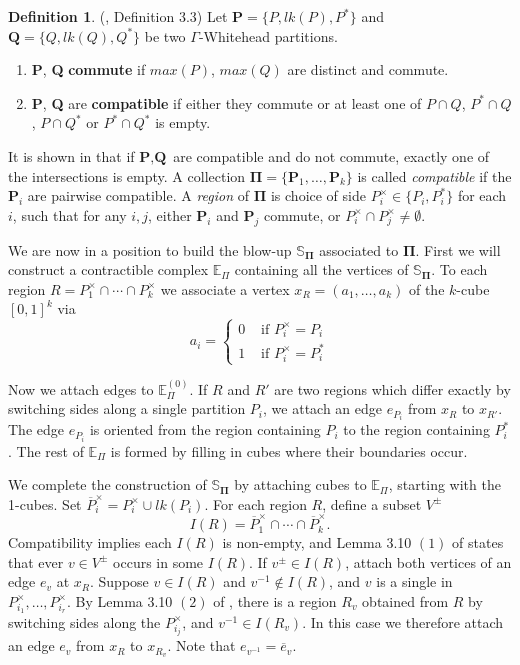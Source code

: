\documentclass[11pt]{amsart}
\numberwithin{thm}{section}
\theoremstyle{remark}
\theoremstyle{definition}
\newtheorem{definition}[thm]{Definition}
\newcommand{\overl}[1]{\overline{#1}}
\newcommand{\E}{\mathbb{E}}
\newcommand{\Sa}{\mathbb{S}}
\begin{document}
\begin{definition} (\cite{CSV12}, Definition 3.3) Let $\textbf{P}=\{P,lk(P), P^*\}$ and $\textbf{Q}=\{Q,lk(Q), Q^*\}$ be two $\Gamma$-Whitehead partitions.  \begin{enumerate}
\item \textbf{P}, \textbf{Q} \textbf{commute} if $max(P)$, $max(Q)$ are distinct and commute.
\item \textbf{P}, \textbf{Q} are \textbf{compatible} if either they commute or at least one of $P\cap Q$,  $P^*\cap Q$, $P\cap Q^*$ or $P^*\cap Q^*$ is empty.
\end{enumerate}
\end{definition}

It is shown in \cite{CSV12} that if $\textbf{P}, \textbf{Q}$ are compatible and do not commute, exactly one of the intersections is empty.  A collection $\mathbf{\Pi}=\{\textbf{P}_1,\ldots,\textbf{P}_k\}$ is called \emph{compatible} if the $\textbf{P}_i$ are pairwise compatible.  A \emph{region} of $\mathbf{\Pi}$ is choice of side $P_i^{\times}\in \{P_i,P_i^*\}$ for each $i$, such that for any $i,j$, either $\textbf{P}_i$ and $\textbf{P}_j$ commute, or $P_i^{\times}\cap P_j^{\times}\neq \emptyset$. 

We are now in a position to build the blow-up $\Sa_{\mathbf{\Pi}}$ associated to $\mathbf{\Pi}$.  First we will construct a contractible complex $\E_\Pi$ containing all the vertices of $\Sa_{\mathbf{\Pi}}$. To each region $R=P_1^{\times}\cap\cdots\cap P_k^{\times}$ we associate a vertex $x_R=(a_1,\ldots,a_k)$ of the $k$-cube $[0,1]^k$ via \[a_i=\left\{\begin{array}{ll} 0&\mbox{ if $P_i^{\times}=P_i$}\\
1 & \mbox{ if $P_i^{\times}=P_i^*$}\end{array}\right.\]

Now we attach edges to $\E_\Pi^{(0)}$.  If $R$ and $R'$ are two regions which differ exactly by switching sides along a single partition $P_i$, we attach an edge $e_{P_i}$ from $x_R$ to $x_{R'}$.  The edge $e_{P_i}$ is oriented from the region containing $P_i$ to the region containing $P_i^*$.  The rest of $\E_\Pi$ is formed by filling in cubes where their boundaries occur.  

We complete the construction of $\Sa_{\mathbf{\Pi}}$ by attaching cubes to $\E_\Pi$, starting with the 1-cubes.  Set $\overl{P}_i^{\times}=P_i^{\times}\cup lk(P_i)$.  For each region $R$, define a subset $V^{\pm}$ \[I(R)=\overl{P}_1^{\times}\cap\cdots\cap\overl{P}_k^{\times}.\] Compatibility implies each $I(R)$ is non-empty, and Lemma 3.10 $(1)$ of \cite{CSV12} states that ever $v\in V^{\pm}$ occurs in some $I(R)$. If $v^{\pm}\in I(R)$, attach both vertices of an edge $e_v$ at $x_R$.  Suppose $v\in I(R)$ and $v^{-1}\notin I(R)$, and $v$ is a single in $P_{i_1}^{\times},\ldots,P_{i_r}^{\times}$. By Lemma 3.10 $(2)$ of \cite{CSV12}, there is a region $R_v$ obtained from $R$ by switching sides along the $P_{i_j}^{\times}$, and $v^{-1}\in I(R_v)$.  In this case we therefore attach an edge $e_v$ from $x_R$ to $x_{R_v}$. Note that $e_{v^{-1}}=\overl{e}_{v} $.  
\end{document}
